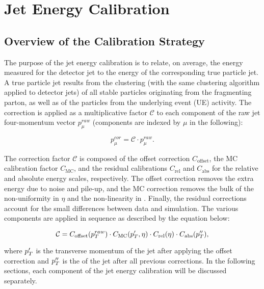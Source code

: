 \section{Jet Energy Calibration}\label{sec:jec}

\subsection{Overview of the Calibration Strategy}

The purpose of the jet energy calibration is to relate, on average, the energy measured for the detector jet to the energy of the corresponding true particle jet. A true particle jet results from the clustering (with the same clustering algorithm applied to detector jets) of all stable particles originating from the fragmenting parton, as well as of the particles from the underlying event (UE) activity. The correction is applied as a multiplicative factor $\mathcal{C}$ to each component of the raw jet four-momentum vector $p_\mu^{raw}$ (components are indexed by $\mu$ in the following):

\begin{equation}
  \label{eq:master}
  p_\mu^{cor} = \mathcal{C}\cdot p_\mu^{raw}.
\end{equation}

The correction factor $\mathcal{C}$ is composed of the offset correction $C_\text{offset}$, the MC calibration factor $C_\text{MC}$, and the residual calibrations $C_\text{rel}$ and $C_\text{abs}$ for the relative and absolute energy scales, respectively. The offset correction removes the extra energy due to noise and pile-up, and the MC correction removes the bulk of the non-uniformity in $\eta$ and the non-linearity in \pt. Finally, the residual corrections account for the small differences between data and simulation. The various components are applied in sequence as described by the equation below:

\begin{equation}
  \label{eq:jec_components}
  \mathcal{C} = C_\text{offset}(p_{{T}}^{raw})\cdot C_\text{MC}(p_{{T}}^{\prime},\eta)\cdot C_\text{rel}(\eta)\cdot C_\text{abs}(p_{{T}}^{\prime\prime}),
\end{equation}

where $p_{{T}}^{\prime}$ is the transverse momentum of the jet after applying the offset correction and $p_{{T}}^{\prime\prime}$ is the \pt of the jet after all previous corrections. In the following sections, each component of the jet energy calibration will be discussed separately.































